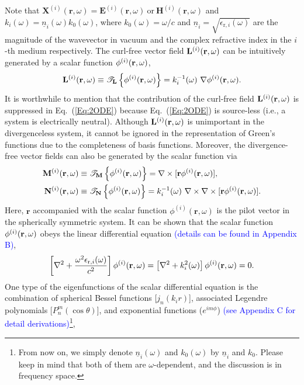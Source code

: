 \documentclass[journal=jacsat,manuscript=article,layout=traditional]{achemso}
\newcommand*\br{\mathbf{r}}
\newcommand*\blue[1]{\textcolor{blue}{#1}}
\newcommand{\nr}{\underline{n}}
\begin{document}
Note that $\mathbf{X}^{(i)}(\mathbf{r},\omega)= \mathbf{E}^{(i)}(\mathbf{r},\omega)\  \textrm{or}\  \mathbf{H}^{(i)}(\mathbf{r},\omega)$ and  $k_i(\omega)=\nr_i(\omega)k_0(\omega)$, where $k_0(\omega)=\omega/c$ and $\nr_i=\sqrt{\epsilon_{\mathrm{r},i}(\omega)}$ are the magnitude of the wavevector in vacuum and the complex refractive index in the $i$-th medium respectively.
The curl-free vector field $\vb{L}^{(i)}(\vb{r},\omega)$ can be intuitively generated by a scalar function $\phi^{(i)}(\vb{r},\omega)$,
\begin{align}
    \vb{L}^{(i)}(\vb{r},\omega) \equiv \mathcal{T}_{\vb{L}}\left\{\phi^{(i)}(\mathbf{r},\omega)\right\}=k_i^{-1}(\omega)~\nabla\phi^{(i)}(\mathbf{r},\omega).
    \label{Eq:TL}
\end{align}
It is worthwhile to mention that the contribution of the curl-free field $\vb{L}^{(i)}(\vb{r},\omega)$ is suppressed in Eq.~(\ref{Eq:2ODE}) because Eq.~(\ref{Eq:2ODE}) is source-less (i.e., a system is electrically neutral).
Although $\vb{L}^{(i)}(\vb{r},\omega)$ is unimportant in the divergenceless system, it cannot be ignored in the representation of Green's functions due to the completeness of basis functions.
Moreover, the divergence-free vector fields can also be generated by the scalar function via
\begin{align}
    \label{Eq:TM}
    \vb{M}^{(i)}(\vb{r},\omega) &\equiv \mathcal{T}_{\vb{M}}\left\{\phi^{(i)}(\mathbf{r},\omega)\right\}=\nabla\times[\br\phi^{(i)}(\mathbf{r},\omega)],\\
    \label{Eq:TN}
    \vb{N}^{(i)}(\vb{r},\omega) &\equiv \mathcal{T}_{\vb{N}}\left\{\phi^{(i)}(\mathbf{r},\omega)\right\}=k_i^{-1}(\omega)~\nabla\times\nabla\times[\br\phi^{(i)}(\mathbf{r},\omega)].
\end{align}
Here, $\br$ accompanied with the scalar function $\phi^{(i)}(\br,\omega)$ is the pilot vector in the spherically symmetric system\cite{chew1995waves}.
It can be shown that the scalar function $\phi^{(i)}(\vb{r},\omega)$ obeys the linear differential equation \blue{(details can be found in Appendix B)},
\begin{align}
    \left[\nabla^2 + \frac{\omega^2\epsilon_{\textrm{r},i}(\omega)}{c^2}\right]\phi^{(i)}(\vb{r},\omega) = \left[\nabla^2 + k_i^2(\omega)\right]\phi^{(i)}(\br,\omega) = 0.
    \label{Eq:scalarODE}
\end{align}
One type of the eigenfunctions of the scalar differential equation is the combination of spherical Bessel functions [$j_n(k_ir)$], associated Legendre polynomials [$P_n^m(\cos\theta)$], and exponential functions ($e^{im\phi}$) \blue{(see Appendix C for detail derivations)}\footnote{From now on, we simply denote $\nr_i(\omega)$ and $k_0(\omega)$ by $\nr_i$ and $k_0$. Please keep in mind that both of them are $\omega$-dependent, and the discussion is in frequency space.},
\end{document}
